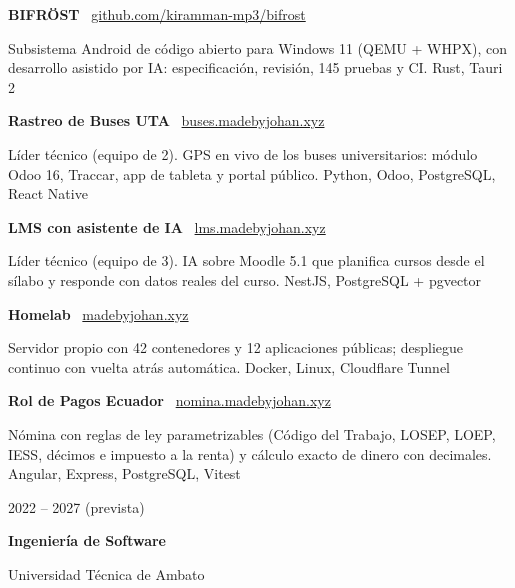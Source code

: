 \documentclass[9pt]{extarticle}
\begin{document}
\begin{minipage}[t]{\anchoPrincipal}
\textbf{BIFRÖST} \textbar\ {\small\href{https://github.com/kiramman-mp3/bifrost}{github.com/kiramman-mp3/bifrost}}\par
Subsistema Android de código abierto para Windows 11 (QEMU + WHPX), con desarrollo asistido por IA: especificación, revisión, 145 pruebas y CI. {\small\color{suave}Rust, Tauri 2}\par\vspace{4pt}
\textbf{Rastreo de Buses UTA} \textbar\ {\small\href{https://buses.madebyjohan.xyz}{buses.madebyjohan.xyz}}\par
Líder técnico (equipo de 2). GPS en vivo de los buses universitarios: módulo Odoo 16, Traccar, app de tableta y portal público. {\small\color{suave}Python, Odoo, PostgreSQL, React Native}\par\vspace{4pt}
\textbf{LMS con asistente de IA} \textbar\ {\small\href{https://lms.madebyjohan.xyz}{lms.madebyjohan.xyz}}\par
Líder técnico (equipo de 3). IA sobre Moodle 5.1 que planifica cursos desde el sílabo y responde con datos reales del curso. {\small\color{suave}NestJS, PostgreSQL + pgvector}\par\vspace{4pt}
\textbf{Homelab} \textbar\ {\small\href{https://madebyjohan.xyz}{madebyjohan.xyz}}\par
Servidor propio con 42 contenedores y 12 aplicaciones públicas; despliegue continuo con vuelta atrás automática. {\small\color{suave}Docker, Linux, Cloudflare Tunnel}\par\vspace{4pt}
\textbf{Rol de Pagos Ecuador} \textbar\ {\small\href{https://nomina.madebyjohan.xyz}{nomina.madebyjohan.xyz}}\par
Nómina con reglas de ley parametrizables (Código del Trabajo, LOSEP, LOEP, IESS, décimos e impuesto a la renta) y cálculo exacto de dinero con decimales. {\small\color{suave}Angular, Express, PostgreSQL, Vitest}\par

{\color{suave}\small 2022 – 2027 (prevista)}\par
\textbf{Ingeniería de Software}\par
Universidad Técnica de Ambato\par
\end{minipage}
\end{document}
